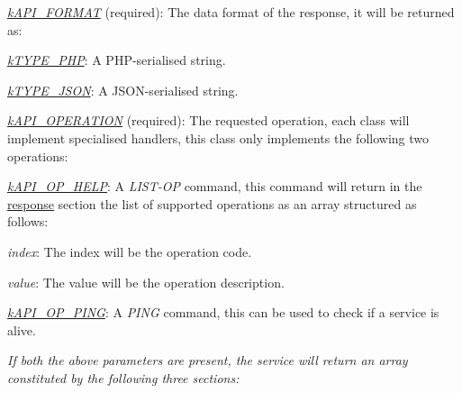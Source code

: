 {\itshape 
\begin{DoxyItemize}
\item {\itshape \hyperlink{}{k\-A\-P\-I\-\_\-\-F\-O\-R\-M\-A\-T}} (required)\-: The data format of the response, it will be returned as\-: 
\begin{DoxyItemize}
\item {\itshape \hyperlink{}{k\-T\-Y\-P\-E\-\_\-\-P\-H\-P}}\-: A P\-H\-P-\/serialised string. 
\item {\itshape \hyperlink{}{k\-T\-Y\-P\-E\-\_\-\-J\-S\-O\-N}}\-: A J\-S\-O\-N-\/serialised string. 
\end{DoxyItemize}
\item {\itshape \hyperlink{}{k\-A\-P\-I\-\_\-\-O\-P\-E\-R\-A\-T\-I\-O\-N}} (required)\-: The requested operation, each class will implement specialised handlers, this class only implements the following two operations\-: 
\begin{DoxyItemize}
\item {\itshape \hyperlink{}{k\-A\-P\-I\-\_\-\-O\-P\-\_\-\-H\-E\-L\-P}}\-: A {\itshape L\-I\-S\-T-\/\-O\-P} command, this command will return in the \hyperlink{}{response} section the list of supported operations as an array structured as follows\-: 
\begin{DoxyItemize}
\item {\itshape index}\-: The index will be the operation code. 
\item {\itshape value}\-: The value will be the operation description. 
\end{DoxyItemize}
\item {\itshape \hyperlink{}{k\-A\-P\-I\-\_\-\-O\-P\-\_\-\-P\-I\-N\-G}}\-: A {\itshape P\-I\-N\-G} command, this can be used to check if a service is alive. 
\end{DoxyItemize}
\end{DoxyItemize}}

{\itshape If both the above parameters are present, the service will return an array constituted by the following three sections\-:}

